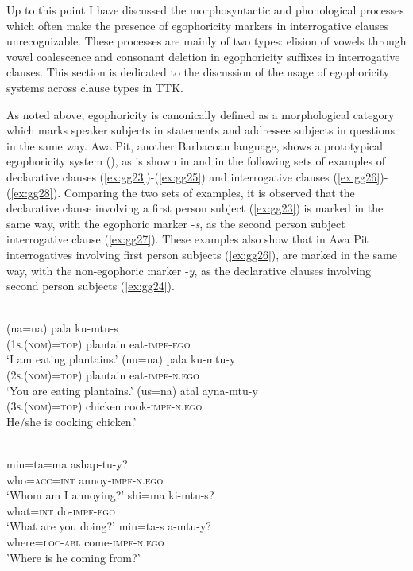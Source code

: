 \documentclass[output=paper]{langsci/langscibook}
\begin{document}
Up to this point I have discussed the morphosyntactic and phonological processes which often make the presence of egophoricity markers in interrogative clauses unrecognizable. These processes are mainly of two types: elision of vowels through vowel coalescence and consonant deletion in egophoricity suffixes in interrogative clauses. This section is dedicated to the discussion of the usage of egophoricity systems across clause types in TTK. 

As noted above, egophoricity is canonically defined as a morphological category which marks speaker subjects in statements and addressee subjects in questions in the same way. Awa Pit, another Barbacoan language, shows a prototypical egophoricity system (\citealt[613]{Curnow2002a}), as is shown in  and in the following sets of examples of declarative clauses (\ref{ex:gg23})-(\ref{ex:gg25}) and interrogative clauses (\ref{ex:gg26})-(\ref{ex:gg28}).%
Comparing the two sets of examples, it is observed that the declarative clause involving a first person subject (\ref{ex:gg23}) is marked in the same way, with the egophoric marker -\textit{s}, as the second person subject interrogative clause (\ref{ex:gg27}). These examples also show that in Awa Pit interrogatives involving first person subjects (\ref{ex:gg26}),
are marked in the same way, with the non-egophoric marker -\textit{y}, as the declarative clauses involving second person subjects (\ref{ex:gg24}). 



\ea 
{}\\ 
	\ea \label{ex:gg23}
    \gll (na=na)	pala ku-mtu-s\\
         (1\textsc{s.(nom)=top}) plantain eat-\textsc{impf-ego}\\
    \glt ‘I am eating plantains.’
  \ex \label{ex:gg24}
    \gll (nu=na)	pala ku-mtu-y\\
   	(2\textsc{s.(nom)=top})	plantain	eat-\textsc{impf-n.ego}\\    
   	\glt ‘You are eating plantains.’
   \ex \label{ex:gg25}
   \gll (us=na)	atal	ayna-mtu-y\\
   (3\textsc{s.(nom)=top})	chicken	cook-\textsc{impf-n.ego}\\
   \glt He/she is cooking chicken.'
\z \z

\ea 
{}\\ 
	\ea \label{ex:gg26}
    \gll min=ta=ma ashap-tu-y?\\
         who=\textsc{acc=int} annoy-\textsc{impf-n.ego}\\
    \glt ‘Whom am I annoying?’
  \ex \label{ex:gg27}
    \gll shi=ma 	ki-mtu-s?\\
   	what=\textsc{int} do-\textsc{impf}-\textsc{ego}\\    
   	\glt ‘What are you doing?’
   \ex \label{ex:gg28}
   \gll min=ta-s a-mtu-y?\\
   where=\textsc{loc-abl} 	come-\textsc{impf-n.ego}\\
   \glt 'Where is he coming from?'
\z \z
\end{document}
